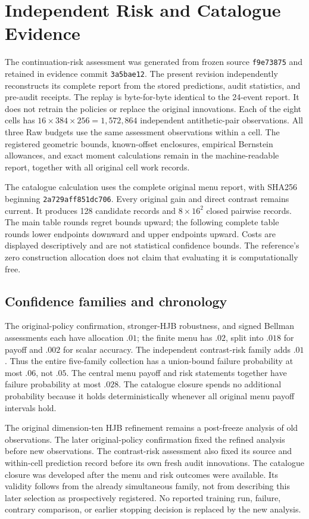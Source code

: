 \section{Independent Risk and Catalogue Evidence}\label{app:r18record}
The continuation-risk assessment was generated from frozen source
\texttt{f9e73875} and retained in evidence commit \texttt{3a5bae12}.
The present revision independently reconstructs its complete report from
the stored predictions, audit statistics, and pre-audit receipts. The replay
is byte-for-byte identical to the 24-event report. It does not retrain the
policies or replace the original innovations. Each of the eight cells has
$16\times384\times256=1,572,864$ independent antithetic-pair observations.
All three Raw budgets use the same assessment observations within a cell.
The registered geometric bounds, known-offset enclosures, empirical
Bernstein allowances, and exact moment calculations remain in the
machine-readable report, together with all original cell work records.

The catalogue calculation uses the complete original menu report, with
SHA256 beginning \texttt{2a729aff851dc706}. Every original gain and direct
contrast remains current. It produces 128 candidate records and $8\times
16^2$ closed pairwise records. The main table rounds regret bounds upward;
the following complete table rounds lower endpoints downward and upper
endpoints upward. Costs are displayed descriptively and are not statistical
confidence bounds. The reference's zero construction allocation does not
claim that evaluating it is computationally free.



\subsection{Confidence families and chronology}
The original-policy confirmation, stronger-HJB robustness, and signed
Bellman assessments each have allocation $.01$; the finite menu has $.02$,
split into $.018$ for payoff and $.002$ for scalar accuracy. The independent
contrast-risk family adds $.01$. Thus the entire five-family collection
has a union-bound failure probability at most $.06$, not $.05$.
The central menu payoff and risk statements together have failure
probability at most $.028$. The catalogue closure spends no additional
probability because it holds deterministically whenever all original menu
payoff intervals hold.

The original dimension-ten HJB refinement remains a post-freeze analysis
of old observations. The later original-policy confirmation fixed the
refined analysis before new observations. The contrast-risk assessment
also fixed its source and within-cell prediction record before its own
fresh audit innovations. The catalogue closure was developed after the
menu and risk outcomes were available. Its validity follows from the
already simultaneous family, not from describing this later selection as
prospectively registered. No reported training run, failure, contrary
comparison, or earlier stopping decision is replaced by the new analysis.
